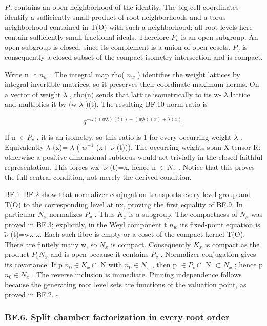 \documentclass[
  11pt,
]{article}
\begin{document}
\(P_{v}\) contains an open neighborhood of the identity. The big-cell
coordinates identify a sufficiently small product of root neighborhoods
and a torus neighborhood contained in T(O) with such a neighborhood; all
root levels here contain sufficiently small fractional ideals. Therefore
\(P_{v}\) is an open subgroup. An open subgroup is closed, since its
complement is a union of open cosets. \(P_{v}\) is consequently a closed
subset of the compact isometry intersection and is compact.

Write n=t \(n_{w}\) . The integral map rho( \(n_{w}\) ) identifies the
weight lattices by integral invertible matrices, so it preserves their
coordinate maximum norms. On a vector of weight \(\lambda\) , rho(n)
sends that lattice isometrically to its w- \(\lambda\) lattice and
multiplies it by (w \(\lambda\) )(t). The resulting BF.10 norm ratio is

\[
 q^{-\omega((w\lambda)(t))-(w\lambda)(x)+\lambda(x)}.
\]

If n \(\in P_{v}\) , it is an isometry, so this ratio is 1 for every
occurring weight \(\lambda\) . Equivalently \(\lambda\) (x)= \(\lambda\)
( \(w^{-1}\) (x+ \(\widetilde\nu\) (t))). The occurring weights span X
tensor R: otherwise a positive-dimensional subtorus would act trivially
in the closed faithful representation. This forces wx- \(\widetilde\nu\)
(t)=x, hence n \(\in N_{x}\) . Notice that this proves the full central
condition, not merely the derived condition.

BF.1--BF.2 show that normalizer conjugation transports every level group
and T(O) to the corresponding level at nx, proving the first equality of
BF.9. In particular \(N_{x}\) normalizes \(P_{v}\) . Thus \(K_{x}\) is a
subgroup. The compactness of \(N_{x}\) was proved in BF.3; explicitly,
in the Weyl component t \(n_{w}\) its fixed-point equation is
\(\widetilde\nu\) (t)=wx-x. Each such fibre is empty or a coset of the
compact kernel T(O). There are finitely many w, so \(N_{x}\) is compact.
Consequently \(K_{x}\) is compact as the product \(P_{v} N_{x}\) and is
open because it contains \(P_{v}\) . Normalizer conjugation gives its
covariance. If p \(n_{0} \in K_{x} \cap\) N with \(n_{0} \in N_{x}\) ,
then p \(\in P_{v} \cap\) N \(\subset N_{x}\) ; hence p
\(n_{0} \in N_{x}\) . The reverse inclusion is immediate. Pinning
independence follows because the generating root level sets are
functions of the valuation point, as proved in BF.2. \(\square\)

\subsubsection{BF.6. Split chamber factorization in every root
order}\label{bf.6.-split-chamber-factorization-in-every-root-order}
\end{document}
